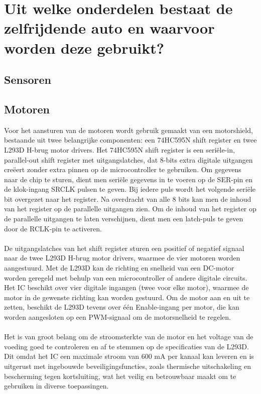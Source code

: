 \section{Uit welke onderdelen bestaat de zelfrijdende auto en waarvoor worden deze gebruikt?}
\subsection{Sensoren}
\subsection{Motoren}
Voor het aansturen van de motoren wordt gebruik gemaakt van een motorshield, bestaande uit twee belangrijke componenten: een 74HC595N shift register en twee L293D H-brug motor drivers. Het 74HC595N shift register is een seriële-in, parallel-out shift register met uitgangslatches, dat 8-bits extra digitale uitgangen creëert zonder extra pinnen op de microcontroller te gebruiken. Om gegevens naar de chip te sturen, dient men seriële gegevens in te voeren op de SER-pin en de klok-ingang SRCLK pulsen te geven. Bij iedere puls wordt het volgende seriële bit overgezet naar het register. Na overdracht van alle 8 bits kan men de inhoud van het register op de parallelle uitgangen zien. Om de inhoud van het register op de parallelle uitgangen te laten verschijnen, dient men een latch-puls te geven door de RCLK-pin te activeren.\\\\
De uitgangslatches van het shift register sturen een positief of negatief signaal naar de twee L293D H-brug motor drivers, waarmee de vier motoren worden aangestuurd. Met de L293D kan de richting en snelheid van een DC-motor worden geregeld met behulp van een microcontroller of andere digitale circuits. Het IC beschikt over vier digitale ingangen (twee voor elke motor), waarmee de motor in de gewenste richting kan worden gestuurd. Om de motor aan en uit te zetten, beschikt de L293D tevens over één Enable-ingang per motor, die kan worden aangesloten op een PWM-signaal om de motorsnelheid te regelen.\\\\
Het is van groot belang om de stroomsterkte van de motor en het voltage van de voeding goed te controleren en af te stemmen op de specificaties van de L293D. Dit omdat het IC een maximale stroom van 600 mA per kanaal kan leveren en is uitgerust met ingebouwde beveiligingsfuncties, zoals thermische uitschakeling en bescherming tegen kortsluiting, wat het veilig en betrouwbaar maakt om te gebruiken in diverse toepassingen.\\\\

